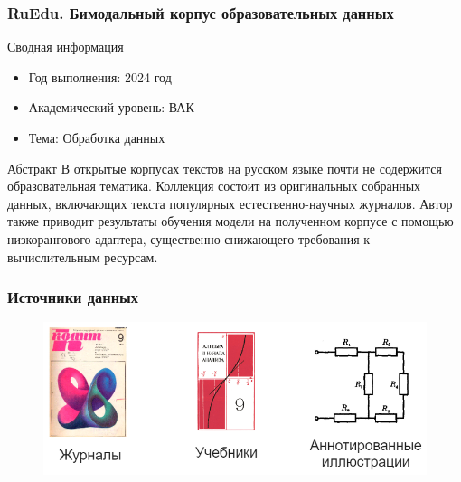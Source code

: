\begin{frame}
    \frametitle{RuEdu. Бимодальный корпус образовательных данных}

    \centering

    \begin{block}{Сводная информация}
        \begin{itemize}
            \item Год выполнения: 2024 год
            \item Академический уровень: ВАК
            \item Тема: Обработка данных
        \end{itemize}
    \end{block}  

    \begin{block}{Абстракт}  
        В открытые корпусах текстов на русском языке почти не содержится образовательная тематика. 
        Коллекция состоит из оригинальных собранных данных, включающих текста популярных естественно-научных журналов. 
        Автор также приводит результаты обучения модели на полученном корпусе с помощью низкорангового адаптера,
        существенно снижающего требования к вычислительным ресурсам.
    \end{block}
\end{frame}


\begin{frame}
    \frametitle{Источники данных}
    \centering
    \begin{figure}
        \includegraphics[width=0.9\linewidth]{assets/ruEdu.excalidraw.png}
    \end{figure}
\end{frame}